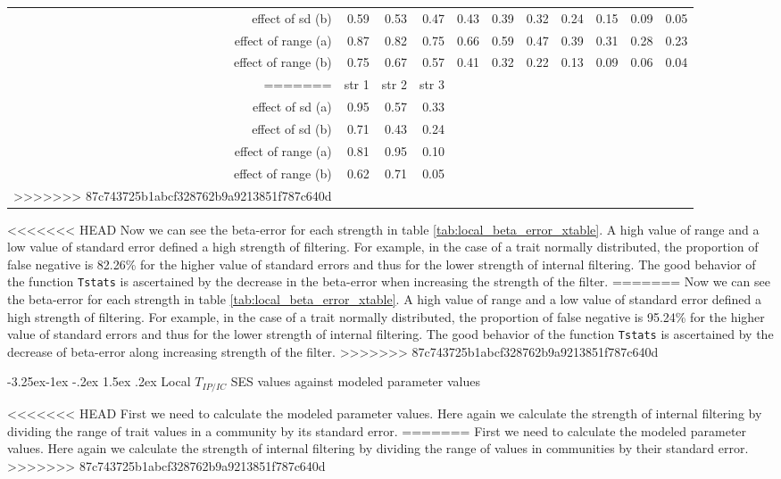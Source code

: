 \documentclass[12pt]{article}\usepackage[]{graphicx}\usepackage[]{color}
\makeatletter
\newcounter {subsubsubsection}[subsubsection]
\newcommand\subsubsubsection{\@startsection{subsubsubsection}{4}{\z@}%
          {-3.25ex\@plus -1ex \@minus -.2ex}%
          {1.5ex \@plus .2ex}%
          {\normalfont\normalsize\bfseries}}
\makeatother
\begin{document}
\begin{landscape}
\begin{table}[ht]
{\begin{table}[ht]
{\begin{tabular}{rrrrrrrrrrr}
  effect of sd (b) & 0.59 & 0.53 & 0.47 & 0.43 & 0.39 & 0.32 & 0.24 & 0.15 & 0.09 & 0.05 \\ 
  effect of range (a) & 0.87 & 0.82 & 0.75 & 0.66 & 0.59 & 0.47 & 0.39 & 0.31 & 0.28 & 0.23 \\ 
  effect of range (b) & 0.75 & 0.67 & 0.57 & 0.41 & 0.32 & 0.22 & 0.13 & 0.09 & 0.06 & 0.04 \\ 
=======
\begin{tabular}{rrrr}
  \hline
 & str 1 & str 2 & str 3 \\ 
  \hline
effect of sd (a) & 0.95 & 0.57 & 0.33 \\ 
  effect of sd (b) & 0.71 & 0.43 & 0.24 \\ 
  effect of range (a) & 0.81 & 0.95 & 0.10 \\ 
  effect of range (b) & 0.62 & 0.71 & 0.05 \\ 
>>>>>>> 87c743725b1abcf328762b9a9213851f787c640d
   \hline
\end{tabular}
}
\end{table}

 

<<<<<<< HEAD
Now we can see the beta-error for each strength in table \ref{tab:local_beta_error_xtable}. A high value of range and a low value of standard error defined a high strength of filtering. For example, in the case of a trait normally distributed, the proportion of false negative is 82.26\% for the higher value of standard errors and thus for the lower strength of internal filtering. The good behavior of the function \texttt{Tstats} is ascertained by the decrease in the beta-error when increasing the strength of the filter.
=======
Now we can see the beta-error for each strength in table \ref{tab:local_beta_error_xtable}. A high value of range and a low value of standard error defined a high strength of filtering. For example, in the case of a trait normally distributed, the proportion of false negative is 95.24\% for the higher value of standard errors and thus for the lower strength of internal filtering. The good behavior of the function \texttt{Tstats} is ascertained by the decrease of beta-error along increasing strength of the filter.
>>>>>>> 87c743725b1abcf328762b9a9213851f787c640d
 
 
  \subsubsubsection {Local $T_{IP/IC}$ SES values against modeled parameter values}
  
<<<<<<< HEAD
  First we need to calculate the modeled parameter values. Here again we calculate the strength of internal filtering by dividing the range of trait values in a community by its standard error.
=======
  First we need to calculate the modeled parameter values. Here again we calculate the strength of internal filtering by dividing the range of values in communities by their standard error.
>>>>>>> 87c743725b1abcf328762b9a9213851f787c640d
  
}
\end{table}
\end{landscape}
\end{document}
